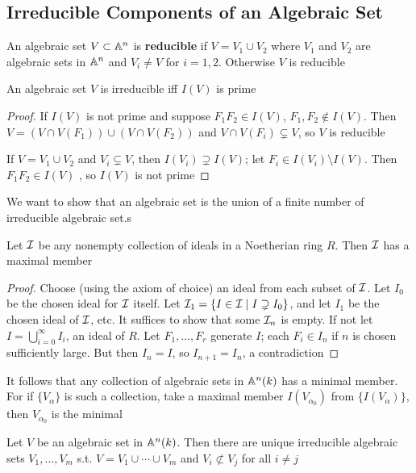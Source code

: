 \documentclass[11pt]{article}
\begin{document}
\subsection{Irreducible Components of an Algebraic Set}
\label{sec:orgf4dfcae}
An algebraic set \(V\subset\mathbb{A}^n\) is \textbf{reducible} if \(V=V_1\cup V_2\) where \(V_1\) and \(V_2\) are algebraic sets
in \(\mathbb{A}^n\) and \(V_i\neq V\) for \(i=1,2\). Otherwise \(V\) is reducible

\begin{proposition}[]
\label{prop1.1}
An algebraic set \(V\) is irreducible iff \(I(V)\) is prime
\end{proposition}

\begin{proof}
If \(I(V)\) is not prime and suppose \(F_1F_2\in I(V)\), \(F_1,F_2\notin I(V)\).
Then \(V=(V\cap V(F_1))\cup(V\cap V(F_2))\) and \(V\cap V(F_i)\subsetneq V\), so \(V\) is reducible

If \(V=V_1\cup V_2\) and \(V_i\subsetneq V\), then \(I(V_i)\supsetneq I(V)\); let \(F_i\in I(V_i)\setminus I(V)\).
Then \(F_1F_2\in I(V)\) , so \(I(V)\) is not prime
\end{proof}

We want to show that an algebraic set is the union of a finite number of irreducible algebraic
set.s

\begin{lemma}[]
Let \(\mathcal{I}\) be any nonempty collection of ideals in a Noetherian ring \(R\). Then \(\mathcal{I}\) has a
maximal member
\end{lemma}

\begin{proof}
Choose (using the axiom of choice) an ideal from each subset of \(\mathcal{I}\). Let \(I_0\) be the chosen
ideal for \(\mathcal{I}\) itself. Let \(\mathcal{I}_1=\{I\in\mathcal{I}\mid I\supsetneq I_0\}\), and let \(I_1\) be the chosen ideal
of \(\mathcal{I}\), etc. It suffices to show that some \(\mathcal{I}_n\) is empty. If not let \(I=\bigcup_{i=0}^\infty I_i\),
an ideal of \(R\). Let \(F_1,\dots,F_r\) generate \(I\); each \(F_i\in I_n\) if \(n\) is chosen
sufficiently large. But then \(I_n=I\), so \(I_{n+1}=I_n\), a contradiction
\end{proof}

It follows that any collection of algebraic sets in \(\mathbb{A}^n(k)\) has a minimal member. For
if \(\{V_\alpha\}\) is such a collection, take a maximal member \(I(V_{\alpha_0})\) from \(\{I(V_\alpha)\}\),
then \(V_{\alpha_0}\) is the minimal

\begin{theorem}[]
Let \(V\) be an algebraic set in \(\mathbb{A}^n(k)\). Then there are unique irreducible algebraic
sets \(V_1,\dots,V_m\) s.t. \(V=V_1\cup\cdots\cup V_m\) and \(V_i\not\subset V_j\) for all \(i\neq j\)
\end{theorem}
\end{document}

